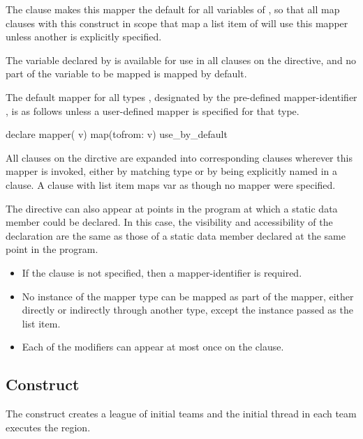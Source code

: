 The  clause makes this mapper the default for all
variables of , so that all map clauses with this construct in scope
that map a list item of  will use this mapper unless another is
explicitly specified.

The variable declared by  is available for use in all 
clauses on the directive, and no part of the variable to be mapped is mapped by
default.

The default mapper for all types , designated by the pre-defined
mapper-identifier , is as follows unless a user-defined mapper is
specified for that type.

\begin{ompSyntax}

declare mapper( v) map(tofrom: v) use_by_default

\end{ompSyntax}

All  clauses on the dirctive are expanded into corresponding
 clauses wherever this mapper is invoked, either by matching type or
by being explicitly named in a  clause. A  clause with list item
 maps var as though no mapper were specified.


\begin{cppspecific}
The  directive can also appear at points in the program at
which a static data member could be declared. In this case, the visibility and
accessibility of the declaration are the same as those of a static data member
declared at the same point in the program.

\end{cppspecific}

\restrictions

\begin{itemize}
\item If the  clause is not specified, then a
  mapper-identifier is required.
\item No instance of the mapper type can be mapped as part of the mapper,
  either directly or indirectly through another type, except the instance passed
  as the list item.
\item Each of the  modifiers can appear at most once on the
    clause.
\end{itemize}

\subsection{ Construct}
\label{subsec:teams Construct}
\summary
The  construct creates a league of initial teams and the initial thread in each
team executes the region.

